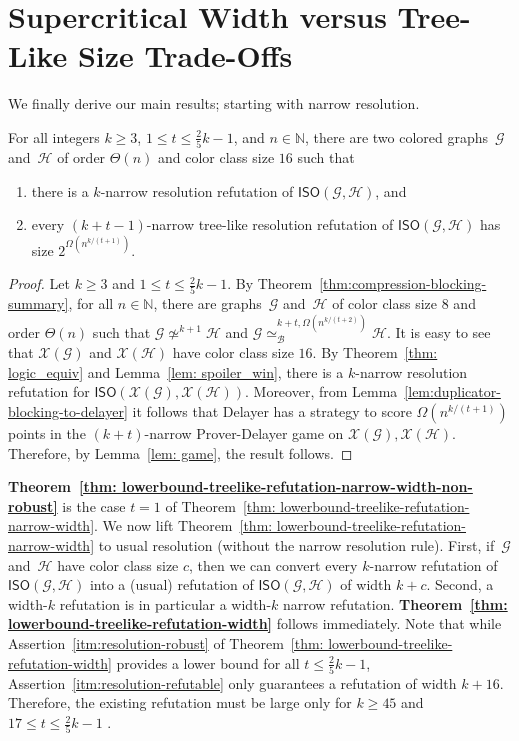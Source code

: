 \documentclass[a4paper,english, thm-restate]{lipics-v2021}
\newcommand{\nat}{\mathbb{N}}
\newcommand{\graphG}{\mathcal{G}}
\newcommand{\graphH}{\mathcal{H}}
\newcommand{\graphXG}{\mathcal{X}(\mathcal{G})}
\newcommand{\graphXH}{\mathcal{X}(\mathcal{H})}
\newcommand{\ISO}{\mathsf{ISO}(\graphG, \graphH)}
\newcommand{\XISO}{\mathsf{ISO}(\graphXG, \graphXH)}
\newcommand{\kbequivr}[2]{\simeq_{\mathcal{B}}^{#1,#2}}
\newcommand{\notkequiv}[1]{\not\simeq^{#1}}
\begin{document}
         
        \section{Supercritical Width versus Tree-Like Size Trade-Offs}

	
We finally derive our main results; starting with narrow resolution.

\begin{theorem}\label{thm: lowerbound-treelike-refutation-narrow-width}
	For all integers $k \geq 3$,  $1\leq t \leq \frac{2}{5}k-1$, and $n\in \nat$, there are two colored graphs~$\graphG$ and~$\graphH$
	of order $\Theta(n)$ and color class size $16$
	such that 
	\begin{enumerate}
		\item there is a $k$-narrow resolution refutation of $\ISO$, and
		\item every $(k+t-1)$-narrow tree-like resolution refutation of $\ISO$ has size $2^{\Omega(n^{k/{(t+1)}})}$.
	\end{enumerate}
\end{theorem}	
\begin{proof}
	Let $k \geq 3$ and $1 \leq t \leq  \frac{2}{5}k-1$.
	By Theorem~\ref{thm:compression-blocking-summary}, for all $n \in \nat$, there are graphs~$\graphG$ and~$\graphH$ of color class size $8$ and order $\Theta(n)$
	such that $\graphG \notkequiv{k+1} \graphH$ 
	and $\graphG \kbequivr{k+t}{\Omega(n^{k/(t+2)})} \graphH$.
	It is easy to see that $\graphXG$ and $\graphXH$ have color class size $16$.
	By Theorem~\ref{thm: logic_equiv} and Lemma~\ref{lem: spoiler_win},
	there is a $k$-narrow resolution refutation for $\XISO$.
	Moreover, from Lemma~\ref{lem:duplicator-blocking-to-delayer} it follows that Delayer has a strategy to score $\Omega(n^{k/(t+1)})$ points in the $(k+t)$\nobreakdash-narrow Prover-Delayer game on $\graphXG, \graphXH$. Therefore, by Lemma~\ref{lem: game}, the result follows.
%
\end{proof}

\noindent \textbf{Theorem~\ref{thm: lowerbound-treelike-refutation-narrow-width-non-robust}}
is the case $t=1$ of Theorem~\ref{thm: lowerbound-treelike-refutation-narrow-width}. We now lift Theorem~\ref{thm: lowerbound-treelike-refutation-narrow-width} to usual resolution (without the narrow resolution rule).
First, if~$\graphG$ and~$\graphH$ have color class size $c$, then we can convert every $k$-narrow refutation of $\ISO$ into a (usual) refutation of $\ISO$ of width $k+c$.
Second, a width-$k$ refutation is in particular a width-$k$ narrow refutation.
\textbf{Theorem~\ref{thm: lowerbound-treelike-refutation-width}} follows immediately.
Note that while Assertion~\ref{itm:resolution-robust} of Theorem~\ref{thm: lowerbound-treelike-refutation-width} provides a lower bound for all $t \leq \frac{2}{5}k -1 $, Assertion~\ref{itm:resolution-refutable} only guarantees a refutation of width $k + 16$.
Therefore, the existing refutation must be large only for $k\geq 45$ and $17 \le t \leq \frac{2}{5}k -1$ .
\end{document}
